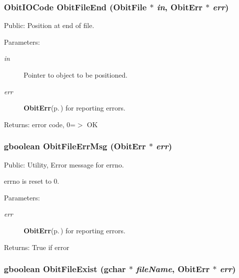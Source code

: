 \subsubsection{\setlength{\rightskip}{0pt plus 5cm}Obit\-IOCode Obit\-File\-End ({\bf Obit\-File} $\ast$ {\em in}, {\bf Obit\-Err} $\ast$ {\em err})}\label{ObitFile_8h_a32}


Public: Position at end of file. 

\begin{Desc}
\item[Parameters:]
\begin{description}
\item[{\em in}]Pointer to object to be positioned. \item[{\em err}]{\bf Obit\-Err}{\rm (p.\,\pageref{structObitErr})} for reporting errors. \end{description}
\end{Desc}
\begin{Desc}
\item[Returns:]error code, 0=$>$ OK \end{Desc}
\subsubsection{\setlength{\rightskip}{0pt plus 5cm}gboolean Obit\-File\-Err\-Msg ({\bf Obit\-Err} $\ast$ {\em err})}\label{ObitFile_8h_a43}


Public: Utility, Error message for errno. 

errno is reset to 0. \begin{Desc}
\item[Parameters:]
\begin{description}
\item[{\em err}]{\bf Obit\-Err}{\rm (p.\,\pageref{structObitErr})} for reporting errors. \end{description}
\end{Desc}
\begin{Desc}
\item[Returns:]True if error \end{Desc}
\subsubsection{\setlength{\rightskip}{0pt plus 5cm}gboolean Obit\-File\-Exist (gchar $\ast$ {\em file\-Name}, {\bf Obit\-Err} $\ast$ {\em err})}\label{ObitFile_8h_a40}



